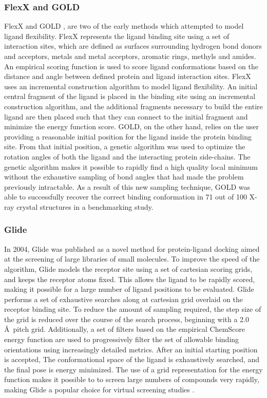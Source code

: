 \subsubsection{FlexX and GOLD}
FlexX \citep{Rarey:1996hf} and \ac{GOLD} \citep{Jones:1997bl}, are two of the early methods which attempted to model ligand flexibility.
FlexX represents the ligand binding site using a set of interaction sites, which are defined as surfaces surrounding hydrogen bond donors and acceptors, metals and metal acceptors, aromatic rings, methyls and amides.
An empirical scoring function is used to score ligand conformations based on the distance and angle between defined protein and ligand interaction sites.
FlexX uses an incremental construction algorithm to model ligand flexibility.
An initial central fragment of the ligand is placed in the binding site using an incremental construction algorithm, and the additional fragments necessary to build the entire ligand are then placed such that they can connect to the initial fragment and minimize the energy function score. 
\ac{GOLD}, on the other hand, relies on the user providing a reasonable initial position for the ligand inside the protein binding site.
From that initial position, a genetic algorithm \citep{Jones:1995vw} was used to optimize the rotation angles of both the ligand and the interacting protein side-chains. 
The genetic algorithm makes it possible to rapidly find a high quality local minimum without the exhaustive sampling of bond angles that had made the problem previously intractable.
As a result of this new sampling technique, \ac{GOLD} was able to successfully recover the correct binding conformation in 71 out of 100 X-ray crystal structures in a benchmarking study. 

\subsubsection{Glide}
In 2004, Glide \citep{Friesner:2004hm} was published as a novel method for protein-ligand docking aimed at the screening of large libraries of small molecules.
To improve the speed of the algorithm, Glide models the receptor site using a set of cartesian scoring grids, and keeps the receptor atoms fixed.
This allows the ligand to be rapidly scored, making it possible for a large number of ligand positions to be evaluated.
Glide performs a set of exhaustive searches along at cartesian grid overlaid on the receptor binding site.
To reduce the amount of sampling required, the step size of the grid is reduced over the course of the search process, beginning with a 2.0 \AA\ pitch grid.
Additionally, a set of filters based on the empirical ChemScore \citep{Eldridge:1997tm} energy function are used to progressively filter the set of allowable binding orientations using increasingly detailed metrics.
After an initial starting position is accepted, The conformational space of the ligand is exhaustively searched, and the final pose is energy minimized.
The use of a grid representation for the energy function makes it possible to to screen large numbers of compounds very rapidly, making Glide a popular choice for virtual screening studies \citep{Yilmaz:2013dj,Bauer:2013de}.


